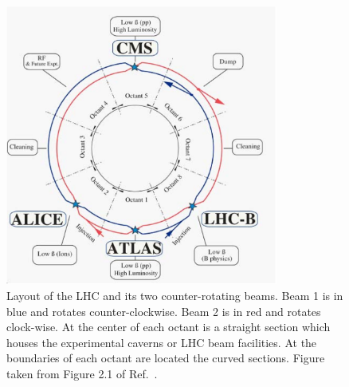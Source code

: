 \begin{figure}[!htb]
    \begin{center}
        \includegraphics[width=0.8\textwidth]{figures/chapter2/lhc_layout}
        \caption{
            Layout of the LHC and its two counter-rotating beams. Beam 1 is in blue and rotates
            counter-clockwise. Beam 2 is in red and rotates clock-wise.
            At the center of each octant is a straight section which houses
            the experimental caverns or LHC beam facilities.
            At the boundaries of each octant are located the curved sections.
            Figure taken from Figure 2.1 of Ref.~\cite{LHCMachine}.
            {\color{red}{Somewhere $\beta$ should be described -- betatron function}}
        }
        \label{fig:lhc_layout}
    \end{center}
\end{figure}

